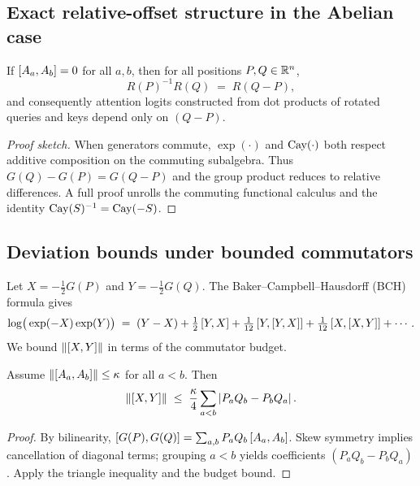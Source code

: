 \label{sec:theory}
\subsection{Exact relative-offset structure in the Abelian case}
\begin{theorem}
If $\left[ A_a, A_b \right]=0$ for all $a,b$, then for all positions $P,Q\in\mathbb{R}^n$,
\begin{equation}
  R(P)^{-1}R(Q) \;=\; R(Q-P),
\end{equation}
and consequently attention logits constructed from dot products of rotated queries and keys depend only on $(Q-P)$.
\end{theorem}

\begin{proof}[Proof sketch]
When generators commute, $\exp(\cdot)$ and $\mathrm{Cay}(\cdot)$ both respect additive composition on the commuting subalgebra.
Thus $G(Q)-G(P)=G(Q-P)$ and the group product reduces to relative differences.
A full proof unrolls the commuting functional calculus and the identity $\mathrm{Cay}(S)^{-1}=\mathrm{Cay}(-S)$.
\end{proof}

\subsection{Deviation bounds under bounded commutators}
Let $X=-\tfrac12 G(P)$ and $Y=-\tfrac12 G(Q)$.
The Baker--Campbell--Hausdorff (BCH) formula gives
\begin{equation}
  \log\!\big(\exp(-X)\exp(Y)\big)
  \;=\;
  (Y-X) + \tfrac12\left[ Y, X \right] + \tfrac1{12}\left[ Y, \left[ Y, X \right] \right] + \tfrac1{12}\left[ X, \left[ X, Y \right] \right] + \cdots.
\end{equation}
We bound $\left\lVert \left[ X, Y \right] \right\rVert$ in terms of the commutator budget.
\begin{lemma}
Assume $\left\lVert \left[ A_a, A_b \right] \right\rVert\le \kappa$ for all $a<b$.
Then
\begin{equation}
  \left\lVert \left[ X, Y \right] \right\rVert
  \;\le\;
  \frac{\kappa}{4}\sum_{a<b} \left| P_aQ_b - P_bQ_a \right|.
\end{equation}
\end{lemma}

\begin{proof}
By bilinearity,
$\left[ G(P), G(Q) \right]=\sum_{a,b}P_aQ_b\left[ A_a, A_b \right]$.
Skew symmetry implies cancellation of diagonal terms; grouping $a<b$ yields coefficients $(P_aQ_b-P_bQ_a)$.
Apply the triangle inequality and the budget bound.
\end{proof}

